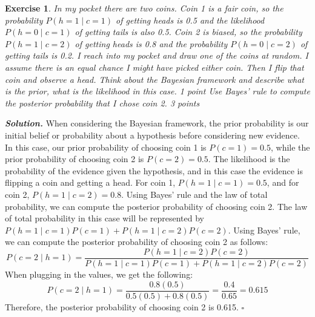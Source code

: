 \documentclass[12pt]{article}
\newtheorem{exercise}{Exercise}
\newenvironment{solution}[1][\it{Solution}]{\textbf{#1. } }{$\square$}
\begin{document}
\begin{exercise}
In my pocket there are two coins. Coin 1 is a fair coin, so the probability $P(h = 1 \mid c = 1)$ of getting heads is 0.5 and the likelihood $P(h = 0 \mid c = 1)$ of getting tails is also 0.5.
Coin 2 is biased, so the probability $P(h = 1 \mid c = 2)$ of getting heads is 0.8 and the probability $P(h = 0 \mid c = 2)$ of getting tails is 0.2. 
I reach into my pocket and draw one of the coins at random. I assume there is an equal chance I might have picked either coin. Then I flip that coin and observe a head. \newline
\newline Think about the Bayesian framework and describe what is the prior, what is the likelihood in this case. 1 point \newline
\newline Use Bayes' rule to compute the posterior probability that I chose coin 2. 3 points
\end{exercise}
\begin{solution}
When considering the Bayesian framework, the prior probability is our initial belief or probability about a hypothesis before considering new evidence. 
In this case, our prior probability of choosing coin 1 is $P(c = 1) = 0.5$, while the prior probability of choosing coin 2 is $P(c = 2) = 0.5$.
The likelihood is the probability of the evidence given the hypothesis, and in this case the evidence is flipping a coin and getting a head. 
For coin 1, $P(h = 1 \mid c = 1) = 0.5$, and for coin 2, $P(h = 1 \mid c = 2) = 0.8$.
Using Bayes' rule and the law of total probability, we can compute the posterior probability of choosing coin 2. 
The law of total probability in this case will be represented by $P(h = 1 \mid c = 1)P(c = 1) + P(h = 1 \mid c = 2)P(c = 2)$.
Using Bayes' rule, we can compute the posterior probability of choosing coin 2 as follows:
\begin{equation}
P(c = 2 \mid h = 1) = \frac{P(h = 1 \mid c = 2)P(c = 2)}{P(h = 1 \mid c = 1)P(c = 1) + P(h = 1 \mid c = 2)P(c = 2)}
\end{equation}
When plugging in the values, we get the following:
\begin{equation}
P(c = 2 \mid h = 1) = \frac{0.8(0.5)}{0.5(0.5) + 0.8(0.5)} = \frac{0.4}{0.65} = 0.615
\end{equation}
Therefore, the posterior probability of choosing coin 2 is 0.615.
\end{solution}
\end{document}
